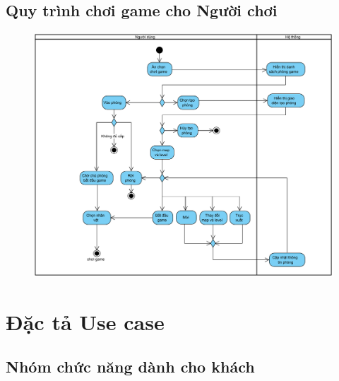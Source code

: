 \documentclass[3p]{elsarticle}
\begin{document}
\newpage
\subsection{Quy trình chơi game cho Người chơi}
\begin{figure}[!htbp]
	\centering
	\includegraphics[scale=.5]{images/activities/Playgame.pdf}
\end{figure}
%
%
%
\newpage
\section{Đặc tả Use case}
\subsection{Nhóm chức năng dành cho khách}
\end{document}
